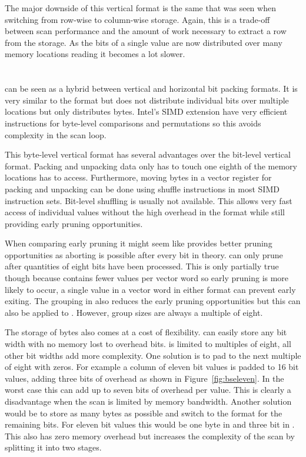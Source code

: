 The major downside of this vertical format is the same that was seen when
switching from row-wise to column-wise storage. Again, this is a trade-off
between scan performance and the amount of work necessary to extract a row from
the storage. As the bits of a single value are now distributed over many memory
locations reading it becomes a lot slower.

\section{\bs{}}

\bs{} \cite{ByteSlice} can be seen as a hybrid between vertical and horizontal
bit packing formats. It is very similar to the \bwv{} format but does not
distribute individual bits over multiple locations but only distributes bytes.
Intel's SIMD extension have very efficient instructions for byte-level
comparisons and permutations so this avoids complexity in the scan loop.

This byte-level vertical format has several advantages over the bit-level
vertical format. Packing and unpacking \bs{} data only has to touch one eighth
of the memory locations \bwv{} has to access. Furthermore, moving bytes in a
vector register for packing and unpacking can be done using shuffle instructions
in most SIMD instruction sets. Bit-level shuffling is usually not available.
This allows very fast access of individual values without the high overhead in
the \bwv{} format while still providing early pruning opportunities.

When comparing early pruning it might seem like \bwv{} provides better pruning
opportunities as aborting is possible after every bit in theory. \bs{} can only
prune after quantities of eight bits have been processed. This is only partially
true though because \bs{} contains fewer values per vector word so early pruning
is more likely to occur, a single value in a vector word in either format can
prevent early exiting. The grouping in \bwv{} also reduces the early pruning
opportunities but this can also be applied to \bs{}. However, \bs{} group sizes
are always a multiple of eight.

The storage of bytes also comes at a cost of flexibility. \bwv{} can easily
store any bit width with no memory lost to overhead bits. \bs{} is limited to
multiples of eight, all other bit widths add more complexity. One solution is to
pad to the next multiple of eight with zeros. For example a column of eleven bit
values is padded to 16 bit values, adding three bits of overhead as shown in
Figure~\ref{fig:bseleven}. In the worst case this can add up to seven bits of
overhead per value. This is clearly a disadvantage when the scan is limited by
memory bandwidth. Another solution would be to store as many bytes as possible
and switch to the \bwv{} format for the remaining bits. For eleven bit values
this would be one byte in \bs{} and three bit in \bwv{}. This also has zero
memory overhead but increases the complexity of the scan by splitting it into
two stages.

